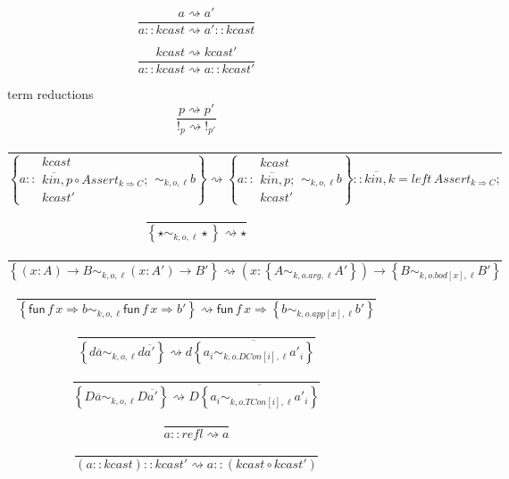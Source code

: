 \begin{figure}
\[
\frac{a\rightsquigarrow a'}{a::kcast\rightsquigarrow a'::kcast}
\]

\[
\frac{kcast\rightsquigarrow kcast'}{a::kcast\rightsquigarrow a::kcast'}
\]

term reductions
\[
\frac{p\rightsquigarrow p'}{!_{p}\rightsquigarrow!_{p'}}
\]

\[
\frac{\,}{\left\{ a::\begin{array}{l}
kcast\\
\overline{kin,}p\circ Assert_{k\Rightarrow C};\\
kcast'
\end{array}\sim_{k,o,\ell}b\right\} \rightsquigarrow\left\{ a::\begin{array}{c}
kcast\\
\overline{kin,}p;\\
kcast'
\end{array}\sim_{k,o,\ell}b\right\} ::\overline{kin,}k=left\,Assert_{k\Rightarrow C};}
\]


\[
\frac{\,}{\left\{ \star\sim_{k,o,\ell}\star\right\} \rightsquigarrow\star}
\]

\[
\frac{\,}{\left\{ \left(x:A\right)\rightarrow B\sim_{k,o,\ell}\left(x:A'\right)\rightarrow B'\right\} \rightsquigarrow\left(x:\left\{ A\sim_{k,o.arg,\ell}A'\right\} \right)\rightarrow\left\{ B\sim_{k,o.bod\left[x\right],\ell}B'\right\} }
\]

\[
\frac{\,}{\left\{ \mathsf{fun}\,f\,x\Rightarrow b\sim_{k,o,\ell}\mathsf{fun}\,f\,x\Rightarrow b'\right\} \rightsquigarrow\mathsf{fun}\,f\,x\Rightarrow\left\{ b\sim_{k,o.app\left[x\right],\ell}b'\right\} }
\]

\[
\frac{\,}{\left\{ d\overline{a}\sim_{k,o,\ell}d\overline{a'}\right\} \rightsquigarrow d\overline{\left\{ a_{i}\sim_{k,o.DCon[i],\ell}a'_{i}\right\} }}
\]

\[
\frac{\,}{\left\{ D\overline{a}\sim_{k,o,\ell}D\overline{a'}\right\} \rightsquigarrow D\overline{\left\{ a_{i}\sim_{k,o.TCon[i],\ell}a'_{i}\right\} }}
\]

\[
\frac{\,}{a::refl\rightsquigarrow a}
\]


\[
\frac{\ }{\left(a::kcast\right)::kcast'\rightsquigarrow a::\left(kcast\circ kcast'\right)}
\]



\end{figure}
